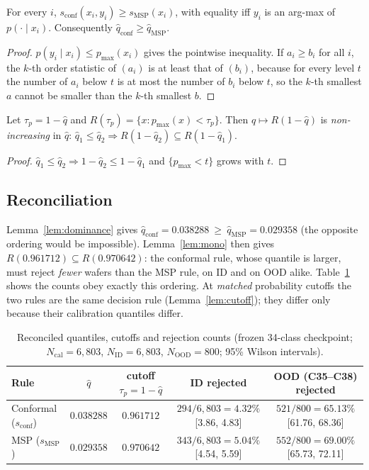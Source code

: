 \begin{lemma}\label{lem:dominance}
For every $i$, $s_{\mathrm{conf}}(x_i,y_i)\ge s_{\mathrm{MSP}}(x_i)$, with equality iff $y_i$ is an
arg-max of $p(\cdot\mid x_i)$. Consequently $\hat q_{\mathrm{conf}}\ge\hat q_{\mathrm{MSP}}$.
\end{lemma}
\begin{proof}
$p(y_i\mid x_i)\le p_{\max}(x_i)$ gives the pointwise inequality. If $a_i\ge b_i$ for all $i$, the
$k$-th order statistic of $(a_i)$ is at least that of $(b_i)$, because for every level $t$ the number of $a_i$ below $t$ is at most the number of $b_i$ below $t$,
so the $k$-th smallest $a$ cannot be smaller than the $k$-th smallest $b$.
\end{proof}

\begin{lemma}\label{lem:mono}
Let $\tau_p=1-\hat q$ and $R(\tau_p)=\{x:p_{\max}(x)<\tau_p\}$. Then $\hat q\mapsto R(1-\hat q)$ is
\emph{non-increasing} in $\hat q$: $\hat q_1\le\hat q_2\Rightarrow R(1-\hat q_2)\subseteq R(1-\hat q_1)$.
\end{lemma}
\begin{proof}
$\hat q_1\le\hat q_2\Rightarrow1-\hat q_2\le1-\hat q_1$ and $\{p_{\max}<t\}$ grows with $t$.
\end{proof}

\subsection{Reconciliation}
Lemma~\ref{lem:dominance} gives $\hat q_{\mathrm{conf}}=0.038288\ \ge\ \hat q_{\mathrm{MSP}}=0.029358$
(the opposite ordering would be impossible). Lemma~\ref{lem:mono} then gives
$R(0.961712)\subseteq R(0.970642)$: the conformal rule, whose quantile is larger, must reject
\emph{fewer} wafers than the MSP rule, on ID and on OOD alike. Table~\ref{tab:c1} shows the
counts obey exactly this ordering. At \emph{matched} probability cutoffs the two rules are the
same decision rule (Lemma~\ref{lem:cutoff}); they differ only because their calibration
quantiles differ.

\begin{table}[h]
\centering\small
\caption{Reconciled quantiles, cutoffs and rejection counts (frozen 34-class checkpoint;
$N_{\mathrm{cal}}=6{,}803$, $N_{\mathrm{ID}}=6{,}803$, $N_{\mathrm{OOD}}=800$; 95\% Wilson intervals).}
\label{tab:c1}
\begin{tabular}{lcccc}
\toprule
Rule & $\hat q$ & cutoff $\tau_p=1-\hat q$ & ID rejected & OOD (C35--C38) rejected\\
\midrule
Conformal ($s_{\mathrm{conf}}$) & $0.038288$ & $0.961712$ & $294/6{,}803=4.32\%$ [3.86, 4.83] & $521/800=65.13\%$ [61.76, 68.36]\\
MSP ($s_{\mathrm{MSP}}$)        & $0.029358$ & $0.970642$ & $343/6{,}803=5.04\%$ [4.54, 5.59] & $552/800=69.00\%$ [65.73, 72.11]\\
\bottomrule
\end{tabular}
\end{table}

